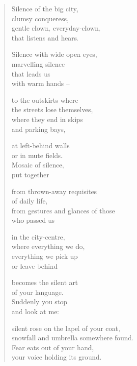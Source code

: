 
\begin{verse}

Silence of the big city,\\
clumsy conqueress,\\
gentle clown, everyday-clown,\\
that listens and hears.

Silence with wide open eyes,\\
marvelling silence\\
that leads us\\
with warm hands --

to the outskirts where\\
the streets lose themselves,\\
where they end in skips\\
and parking bays,

at left-behind walls\\
or in mute fields.\\
Mosaic of silence,\\
put together

from thrown-away requisites\\
of daily life,\\
from gestures and glances of those\\
who passed us

\clearpage

in the city-centre,\\
where everything we do,\\
everything we pick up\\
or leave behind

becomes the silent art\\
of your language.\\
Suddenly you stop\\
and look at me:

silent rose on the lapel of your coat,\\
snowfall and umbrella somewhere found.\\
Fear eats out of your hand,\\
your voice holding its ground.

\end{verse}


